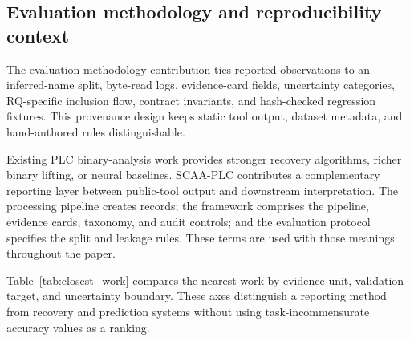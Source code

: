 \documentclass[manuscript,screen,review]{acmart}
\begin{document}
\subsection{Evaluation methodology and reproducibility context}

The evaluation-methodology contribution ties reported observations to an inferred-name split, byte-read logs, evidence-card fields, uncertainty categories, RQ-specific inclusion flow, contract invariants, and hash-checked regression fixtures. This provenance design keeps static tool output, dataset metadata, and hand-authored rules distinguishable.

Existing PLC binary-analysis work provides stronger recovery algorithms, richer binary lifting, or neural baselines. SCAA-PLC contributes a complementary reporting layer between public-tool output and downstream interpretation. The processing pipeline creates records; the framework comprises the pipeline, evidence cards, taxonomy, and audit controls; and the evaluation protocol specifies the split and leakage rules. These terms are used with those meanings throughout the paper.

Table~\ref{tab:closest_work} compares the nearest work by evidence unit, validation target, and uncertainty boundary. These axes distinguish a reporting method from recovery and prediction systems without using task-incommensurate accuracy values as a ranking.
\end{document}

